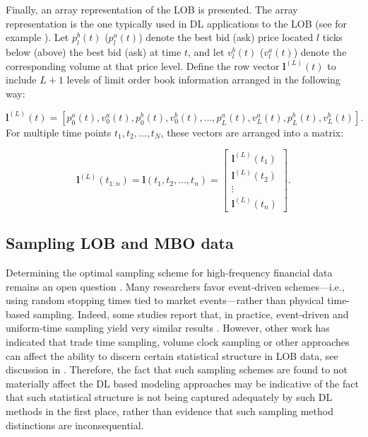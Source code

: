 \documentclass[10pt,a4paper,oneside]{article}
\begin{document}
Finally, an array representation of the LOB is presented. The array representation is the one typically used in DL applications to the LOB (see for example \cite{kolm2024improving, Zhang_2019}). Let $p_l^b(t)$ ($p_l^a(t)$) denote the best bid (ask) price located $l$ ticks below (above) the best bid (ask) at time $t$, and let $v_l^b(t)$ ($v_l^a(t)$) denote the corresponding volume at that price level. Define the row vector $\mathbf{l}^{(L)}(t)$ to include $L + 1$ levels of limit order book information arranged in the following way:

$$
    \mathbf{l}^{(L)}(t) = [p^a_0(t), v^a_0(t), p^b_0(t), v^b_0(t), \dots, p^a_L(t), v^a_L(t), p^b_L(t), v^b_L(t)].
$$
For multiple time points $t_1, t_2, \dots, t_N$, these vectors are arranged into a matrix:

$$
    \mathbf{l}^{(L)}(t_{1:n})=\mathbf{l}(t_1, t_2, \dots, t_n) = \begin{bmatrix}
        \mathbf{l}^{(L)}(t_1) \\
        \mathbf{l}^{(L)}(t_2) \\
        \vdots                \\
        \mathbf{l}^{(L)}(t_n)
    \end{bmatrix}.
$$

\subsection{Sampling LOB and MBO data}
\label{SubSect:SampLOB}
Determining the optimal sampling scheme for high-frequency financial data remains an open question \cite{dutta2023review}.  Many researchers favor event‐driven schemes—i.e., using random stopping times tied to market events—rather than physical time-based sampling.  Indeed, some studies report that, in practice, event‐driven and uniform‐time sampling yield very similar results \cite{easley2021microstructure}. However, other work has indicated that trade time sampling, volume clock sampling or other approaches can affect the ability to discern certain statistical structure in LOB data, see discussion in \cite{koukorinis4959155memory}. Therefore, the fact that such sampling schemes are found to not materially affect the DL based modeling approaches may be indicative of the fact that such statistical structure is not being captured adequately by such DL methods in the first place, rather than evidence that such sampling method distinctions are inconsequential.
\end{document}

